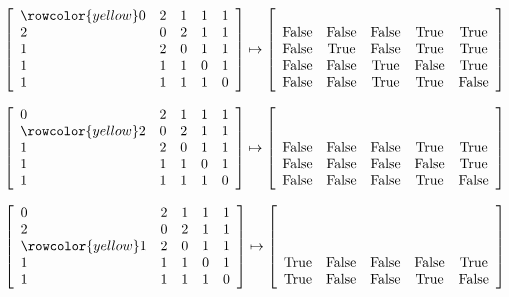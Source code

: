 \documentclass[12pt]{article}
\def\hlr{\rowcolor{yellow}}
\def\True{\mathrm{True}}
\def\False{\mathrm{False}}
\begin{document}
\[
\left[ \begin{array}{lllll}
	\hlr 0 & 2 & 1 & 1 & 1 \\
	     2 & 0 & 2 & 1 & 1 \\
	     1 & 2 & 0 & 1 & 1 \\
	     1 & 1 & 1 & 0 & 1 \\
	     1 & 1 & 1 & 1 & 0
\end{array} \right]
\mapsto
\left[ \begin{array}{ccccc}
	\\
	\False & \False & \False &  \True &  \True \\
	\False &  \True & \False &  \True &  \True \\
	\False & \False &  \True & \False &  \True \\
	\False & \False &  \True &  \True & \False
\end{array} \right]
\]

\[
\left[ \begin{array}{lllll}
	     0 & 2 & 1 & 1 & 1 \\
	\hlr 2 & 0 & 2 & 1 & 1 \\
	     1 & 2 & 0 & 1 & 1 \\
	     1 & 1 & 1 & 0 & 1 \\
	     1 & 1 & 1 & 1 & 0
\end{array} \right]
\mapsto
\left[ \begin{array}{ccccc}
	\\
	\\
	\False & \False & \False &  \True &  \True \\
	\False & \False & \False & \False &  \True \\
	\False & \False & \False &  \True & \False
\end{array} \right]
\]

\[
\left[ \begin{array}{lllll}
	     0 & 2 & 1 & 1 & 1 \\
	     2 & 0 & 2 & 1 & 1 \\
	\hlr 1 & 2 & 0 & 1 & 1 \\
	     1 & 1 & 1 & 0 & 1 \\
	     1 & 1 & 1 & 1 & 0
\end{array} \right]
\mapsto
\left[ \begin{array}{ccccc}
	\\
	\\
	\\
	 \True & \False & \False & \False &  \True \\
	 \True & \False & \False &  \True & \False \\
\end{array} \right]
\]
\end{document}
